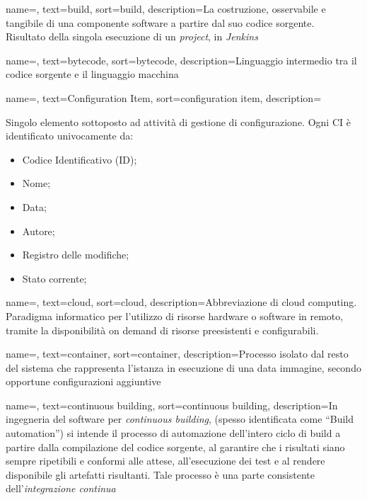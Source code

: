 {
    name=,
    text=build,
    sort=build,
    description={La costruzione, osservabile e tangibile di una componente software a partire dal suo codice sorgente.\\ 
    Risultato della singola esecuzione di un \textit{project}, in \textit{Jenkins}}
}

{
    name=,
    text=bytecode,
    sort=bytecode,
    description={Linguaggio intermedio tra il codice sorgente e il linguaggio macchina}
}

{
    name=,
    text=Configuration Item,
    sort=configuration item,
    description={Singolo elemento sottoposto ad attività di gestione di configurazione. Ogni CI è identificato univocamente da:
        \begin{itemize}
            \item Codice Identificativo (ID);
            \item Nome;
            \item Data;
            \item Autore;
            \item Registro delle modifiche;
            \item Stato corrente;
        \end{itemize}}
}

{
    name=,
    text=cloud,
    sort=cloud,
    description={Abbreviazione di cloud computing. Paradigma informatico per l'utilizzo di risorse hardware o software in remoto, tramite la disponibilità on demand di risorse preesistenti e configurabili.}
}

{
    name=,
    text=container,
    sort=container,
    description={Processo isolato dal resto del sistema che rappresenta l'istanza in esecuzione di una data immagine, secondo opportune configurazioni aggiuntive}
}

{
    name=,
    text=continuous building,
    sort=continuous building,
    description={In ingegneria del software per \emph{continuous building}, (spesso identificata come ``Build automation'') si intende il processo di automazione dell'intero ciclo di build a partire dalla compilazione del codice sorgente, al garantire che i risultati siano sempre ripetibili e conformi alle attese, all'esecuzione dei test e al rendere disponibile gli artefatti risultanti. Tale processo è una parte consistente dell'\textit{integrazione continua}}
}

